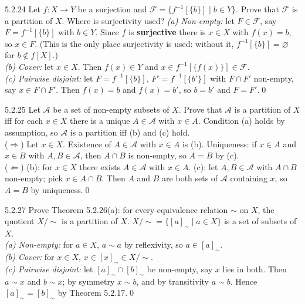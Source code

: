 \begin{bookex}[essential]{5.2.24}
Let $f:X\to Y$ be a surjection and $\mathcal F=\{f^{-1}[\{b\}]\mid b\in Y\}$. Prove that $\mathcal F$ is a partition of $X$. Where is surjectivity used?
\solution
\emph{(a) Non-empty:} let $F\in\mathcal F$, say $F=f^{-1}[\{b\}]$ with $b\in Y$. Since $f$ is \textbf{surjective} there is $x\in X$ with $f(x)=b$, so $x\in F$. (This is the only place surjectivity is used: without it, $f^{-1}[\{b\}]=\varnothing$ for $b\notin f[X]$.)\\
\emph{(b) Cover:} let $x\in X$. Then $f(x)\in Y$ and $x\in f^{-1}[\{f(x)\}]\in\mathcal F$.\\
\emph{(c) Pairwise disjoint:} let $F=f^{-1}[\{b\}]$, $F'=f^{-1}[\{b'\}]$ with $F\cap F'$ non-empty, say $x\in F\cap F'$. Then $f(x)=b$ and $f(x)=b'$, so $b=b'$ and $F=F'$.\qed
\end{bookex}

\begin{bookex}[recommended]{5.2.25}
Let $\mathcal A$ be a set of non-empty subsets of $X$. Prove that $\mathcal A$ is a partition of $X$ iff for each $x\in X$ there is a unique $A\in\mathcal A$ with $x\in A$.
\solution
Condition (a) holds by assumption, so $\mathcal A$ is a partition iff (b) and (c) hold.\\
($\Rightarrow$) Let $x\in X$. Existence of $A\in\mathcal A$ with $x\in A$ is (b). Uniqueness: if $x\in A$ and $x\in B$ with $A,B\in\mathcal A$, then $A\cap B$ is non-empty, so $A=B$ by (c).\\
($\Leftarrow$) (b): for $x\in X$ there exists $A\in\mathcal A$ with $x\in A$. (c): let $A,B\in\mathcal A$ with $A\cap B$ non-empty; pick $x\in A\cap B$. Then $A$ and $B$ are both sets of $\mathcal A$ containing $x$, so $A=B$ by uniqueness.\qed
\end{bookex}

\begin{bookex}[essential]{5.2.27}
Prove Theorem 5.2.26(a): for every equivalence relation $\sim$ on $X$, the quotient $X/{\sim}$ is a partition of $X$.
\solution
$X/{\sim}=\{[a]_\sim\mid a\in X\}$ is a set of subsets of $X$.\\
\emph{(a) Non-empty:} for $a\in X$, $a\sim a$ by reflexivity, so $a\in[a]_\sim$.\\
\emph{(b) Cover:} for $x\in X$, $x\in[x]_\sim\in X/{\sim}$.\\
\emph{(c) Pairwise disjoint:} let $[a]_\sim\cap[b]_\sim$ be non-empty, say $x$ lies in both. Then $a\sim x$ and $b\sim x$; by symmetry $x\sim b$, and by transitivity $a\sim b$. Hence $[a]_\sim=[b]_\sim$ by Theorem 5.2.17.\qed
\end{bookex}

